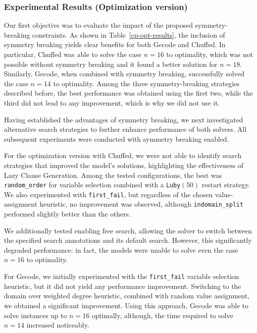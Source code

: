 \subsubsection{Experimental Results (Optimization version)}

Our first objective was to evaluate the impact of the proposed symmetry-breaking constraints. As shown in Table~\ref{cp-opt-results}, the inclusion of symmetry breaking yields clear benefits for both Gecode and Chuffed. In particular, Chuffed was able to solve the case $n=16$ to optimality, which was not possible without symmetry breaking and it found a better solution for $n=18$. Similarly, Gecode, when combined with symmetry breaking, successfully solved the case $n=14$ to optimality. Among the three symmetry-breaking strategies described before, the best performance was obtained using the first two, while the third did not lead to any improvement, which is why we did not use it.

Having established the advantages of symmetry breaking, we next investigated alternative search strategies to further enhance performance of both solvers. All subsequent experiments were conducted with symmetry breaking enabled.

For the optimization version with Chuffed, we were not able to identify search strategies that improved the model’s solutions, highlighting the effectiveness of Lazy Clause Generation. Among the tested configurations, the best was \texttt{random\_order} for variable selection combined with a \texttt{Luby$(50)$} restart strategy. We also experimented with \texttt{first\_fail}, but regardless of the chosen value-assignment heuristic, no improvement was observed, although \texttt{indomain\_split} performed slightly better than the others.

We additionally tested enabling free search, allowing the solver to switch between the specified search annotations and its default search. However, this significantly degraded performance: in fact, the models were unable to solve even the case $n=16$ to optimality.

For Gecode, we initially experimented with the \texttt{first\_fail} variable selection heuristic, but it did not yield any performance improvement. Switching to the domain over weighted degree heuristic, combined with random value assignment, we obtained a significant improvement. Using this approach, Gecode was able to solve instances up to $n=16$ optimally, although, the time required to solve $n=14$ increased noticeably.

